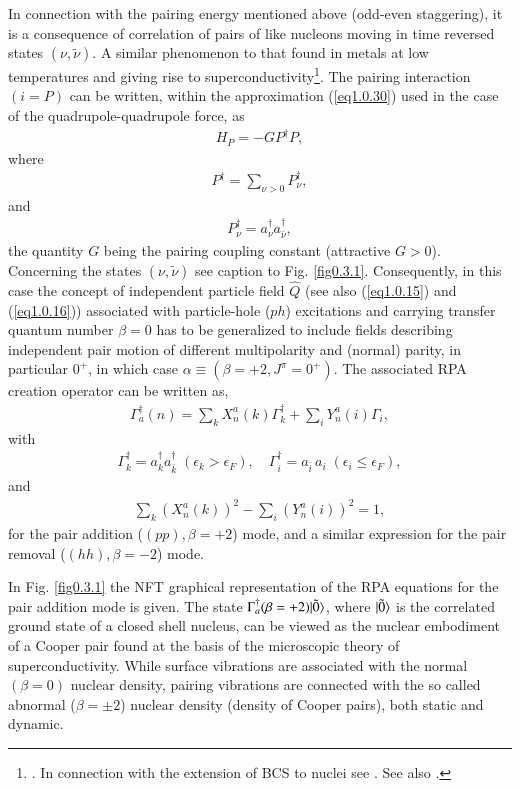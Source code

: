 In connection with the pairing energy mentioned above (odd-even staggering),  it is a consequence of correlation of pairs of like nucleons moving in  time reversed states $(\nu,\tilde \nu)$. A similar phenomenon to that found in metals at low temperatures and giving rise to superconductivity\footnote{\cite{Bardeen:57a,Bardeen:57b}. In connection with the extension of BCS to nuclei see \cite{Bohr:58}. See also \cite{Broglia:13}.}. The pairing interaction $(i=P)$ can be written, within the approximation (\ref{eq1.0.30}) used in the case of the quadrupole-quadrupole force, as 
\begin{align}\label{eq1.0.32}
H_P=- GP^\dagger P,
\end{align}
where
\begin{align}\label{eq1.3.5}
P^\dagger=\sum_{\nu>0}P^\dagger_\nu,
\end{align}
  and
\begin{align}\label{eq1.0.33}
 P^\dagger_\nu=a^\dagger_\nu a^\dagger_{\bar\nu},
\end{align}
the quantity  $G$ being the pairing coupling constant (attractive $G>0$). Concerning the states $(\nu,\tilde\nu)$ see caption to Fig. \ref{fig0.3.1}.
Consequently, in this case the concept of independent particle field $\hat Q$ (see also (\ref{eq1.0.15}) and (\ref{eq1.0.16})) associated with particle-hole ($ph$) excitations and carrying transfer quantum number $\beta=0$ has to be generalized to include fields describing independent pair motion of different multipolarity and (normal) parity, in particular $0^+$, in which case $\alpha\equiv(\beta=+2,J^\pi=0^+)$. The associated RPA creation operator can be written as, 
\begin{align}\label{eq1.0.34}
\Gamma_a^\dagger(n)=\sum_k X_n^a(k)\Gamma_k^\dagger+\sum_iY^a_n(i)\Gamma_i,
\end{align}
with 
\begin{align}\label{eq1.0.35}
\Gamma^\dagger_k=a^\dagger_ka^\dagger_{\bar k}\;(\epsilon_k>\epsilon_F),\quad \Gamma^\dagger_i=a_{\bar i}\,a_i\;(\epsilon_i\leq\epsilon_F),
\end{align}
and
\begin{align}\label{eq1.0.36}
\sum_k\left(X_{n}^{a}(k)\right)^2-\sum_i \left(Y_{n}^{a}(i)\right)^2=1,
\end{align}
for the pair addition ($(pp),\beta=+2$) mode, and a similar expression for the pair removal ($(hh),\beta=-2$) mode.

 In Fig. \ref{fig0.3.1} the NFT graphical representation of the RPA equations for the pair addition mode is given. The state $\Gamma^\dagger_a(\beta=+2)|{\tilde 0} \rangle$, where $|{\tilde 0} \rangle$ is the correlated ground state of a closed shell nucleus, can be viewed as the nuclear embodiment of a Cooper pair found at the basis of the microscopic theory of superconductivity.
While surface vibrations are associated with the normal $(\beta=0)$ nuclear density, pairing vibrations are connected with the so called abnormal ($\beta=\pm2$) nuclear density (density of Cooper pairs), both static and dynamic.

